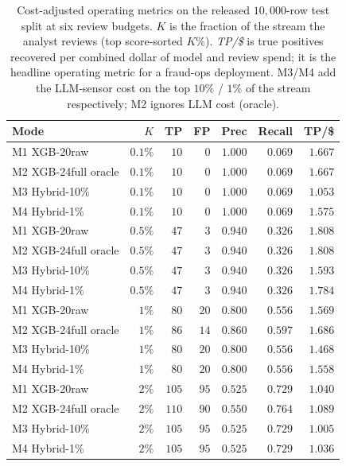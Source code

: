 \documentclass{article}
\begin{document}
\begin{table}[t]
\centering
\small
\caption{Cost-adjusted operating metrics on the released $10{,}000$-row
test split at six review budgets. $K$ is the fraction of the stream
the analyst reviews (top score-sorted $K\%$). \emph{TP/\$} is true
positives recovered per combined dollar of model and review spend; it
is the headline operating metric for a fraud-ops deployment. M3/M4
add the LLM-sensor cost on the top $10\%$ / $1\%$ of the stream
respectively; M2 ignores LLM cost (oracle).}
\label{tab:p8-evidence-cost-curve}
\begin{tabular}{lrrrrrr}
\toprule
Mode & $K$ & TP & FP & Prec & Recall & TP/\$ \\
\midrule
M1 XGB-20raw           & $0.1\%$ & $10$  & $0$   & $1.000$ & $0.069$ & $1.667$ \\
M2 XGB-24full oracle   & $0.1\%$ & $10$  & $0$   & $1.000$ & $0.069$ & $1.667$ \\
M3 Hybrid-10\%         & $0.1\%$ & $10$  & $0$   & $1.000$ & $0.069$ & $1.053$ \\
M4 Hybrid-1\%          & $0.1\%$ & $10$  & $0$   & $1.000$ & $0.069$ & $1.575$ \\
\midrule
M1 XGB-20raw           & $0.5\%$ & $47$  & $3$   & $0.940$ & $0.326$ & $1.808$ \\
M2 XGB-24full oracle   & $0.5\%$ & $47$  & $3$   & $0.940$ & $0.326$ & $1.808$ \\
M3 Hybrid-10\%         & $0.5\%$ & $47$  & $3$   & $0.940$ & $0.326$ & $1.593$ \\
M4 Hybrid-1\%          & $0.5\%$ & $47$  & $3$   & $0.940$ & $0.326$ & $1.784$ \\
\midrule
M1 XGB-20raw           & $1\%$   & $80$  & $20$  & $0.800$ & $0.556$ & $1.569$ \\
M2 XGB-24full oracle   & $1\%$   & $86$  & $14$  & $0.860$ & $0.597$ & $1.686$ \\
M3 Hybrid-10\%         & $1\%$   & $80$  & $20$  & $0.800$ & $0.556$ & $1.468$ \\
M4 Hybrid-1\%          & $1\%$   & $80$  & $20$  & $0.800$ & $0.556$ & $1.558$ \\
\midrule
M1 XGB-20raw           & $2\%$   & $105$ & $95$  & $0.525$ & $0.729$ & $1.040$ \\
M2 XGB-24full oracle   & $2\%$   & $110$ & $90$  & $0.550$ & $0.764$ & $1.089$ \\
M3 Hybrid-10\%         & $2\%$   & $105$ & $95$  & $0.525$ & $0.729$ & $1.005$ \\
M4 Hybrid-1\%          & $2\%$   & $105$ & $95$  & $0.525$ & $0.729$ & $1.036$ \\

\end{tabular}
\end{table}
\end{document}
